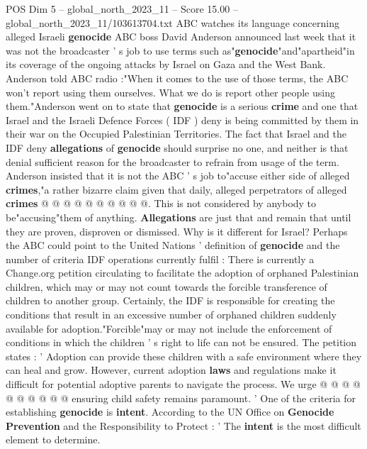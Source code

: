 \begin{textsample}{POS Dim 5 – global\_north\_2023\_11 – Score 15.00 – global\_north\_2023\_11/103613704.txt}  \label{ex:f5_pos_411}
ABC watches its language concerning alleged Israeli \textbf{genocide} ABC boss David Anderson announced last week that it was not the broadcaster ' s job to use terms such as"\textbf{genocide}"and"apartheid"in its coverage of the ongoing attacks by Israel on Gaza and the West Bank.
Anderson told ABC radio :"When it comes to the use of those terms, the ABC won't report using them ourselves.
What we do is report other people using them."Anderson went on to state that \textbf{genocide} is a serious \textbf{crime} and one that Israel and the Israeli Defence Forces ( IDF ) deny is being committed by them in their war on the Occupied Palestinian Territories.
The fact that Israel and the IDF deny \textbf{allegations} of \textbf{genocide} should surprise no one, and neither is that denial sufficient reason for the broadcaster to refrain from usage of the term.
Anderson insisted that it is not the ABC ' s job to"accuse either side of alleged \textbf{crimes},"a rather bizarre claim given that daily, alleged perpetrators of alleged \textbf{crimes} @ @ @ @ @ @ @ @ @ @.
This is not considered by anybody to be"accusing"them of anything. \textbf{Allegations} are just that and remain that until they are proven, disproven or dismissed.
Why is it different for Israel?
Perhaps the ABC could point to the United Nations ' definition of \textbf{genocide} and the number of criteria IDF operations currently fulfil : There is currently a Change.org petition circulating to facilitate the adoption of orphaned Palestinian children, which may or may not count towards the forcible transference of children to another group.
Certainly, the IDF is responsible for creating the conditions that result in an excessive number of orphaned children suddenly available for adoption."Forcible"may or may not include the enforcement of conditions in which the children ' s right to life can not be ensured.
The petition states : ' Adoption can provide these children with a safe environment where they can heal and grow.
However, current adoption \textbf{laws} and regulations make it difficult for potential adoptive parents to navigate the process.
We urge @ @ @ @ @ @ @ @ @ @ ensuring child safety remains paramount. ' One of the criteria for establishing \textbf{genocide} is \textbf{intent}.
According to the UN Office on \textbf{Genocide} \textbf{Prevention} and the Responsibility to Protect : ' The \textbf{intent} is the most difficult element to determine.

\end{textsample}
